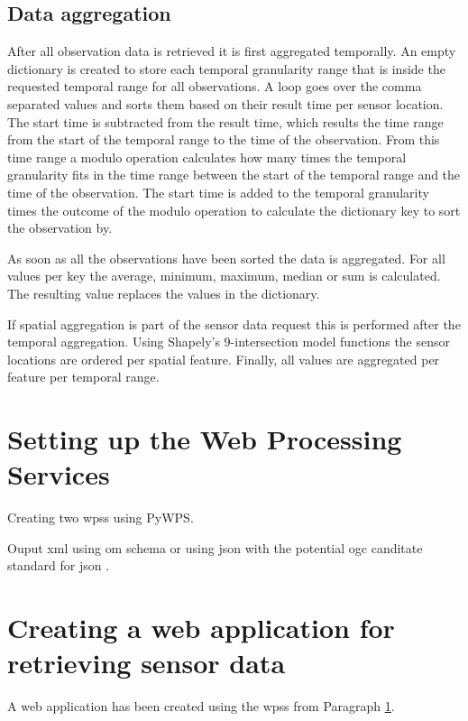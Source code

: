 \subsection{Data aggregation}
After all observation data is retrieved it is first aggregated temporally. An empty dictionary is created to store each temporal granularity range that is inside the requested temporal range for all observations. A loop goes over the comma separated values and sorts them based on their result time per sensor location. The start time is subtracted from the result time, which results the time range from the start of the temporal range to the time of the observation. From this time range a modulo operation calculates how many times the temporal granularity fits in the time range between the start of the temporal range and the time of the observation. The start time is added to the temporal granularity times the outcome of the modulo operation to calculate the dictionary key to sort the observation by.

As soon as all the observations have been sorted the data is aggregated. For all values per key the average, minimum, maximum, median or sum is calculated. The resulting value replaces the values in the dictionary. 

If spatial aggregation is part of the sensor data request this is performed after the temporal aggregation. Using Shapely's 9-intersection model functions the sensor locations are ordered per spatial feature. Finally, all values are aggregated per feature per temporal range.          

\section{Setting up the Web Processing Services}
\label{impl:wps}
Creating two \aclp{wps} using PyWPS.

Ouput \ac{xml} using \ac{om} schema or using \ac{json} with the potential \ac{ogc} canditate standard for \ac{json} \citep{SW:OGC6}.

\section{Creating a web application for retrieving sensor data}
A web application has been created using the \aclp{wps} from Paragraph \ref{impl:wps}.
